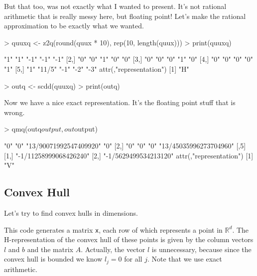 \documentclass{article}
\newcommand{\real}{\mathbb{R}}
\begin{document}
But that too, was not exactly what I wanted to present.
It's not rational arithmetic that is really messy here,
but floating point!  Let's make the rational approximation
to be exactly what we wanted.
\begin{Schunk}
\begin{Sinput}
> quuxq <- z2q(round(quux * 10), rep(10, length(quux)))
> print(quuxq)
\end{Sinput}
\begin{Soutput}
     [,1] [,2]   [,3] [,4] [,5]
[1,] "1"  "1"    "-1" "-1" "-1"
[2,] "0"  "0"    "1"  "0"  "0" 
[3,] "0"  "0"    "0"  "1"  "0" 
[4,] "0"  "0"    "0"  "0"  "1" 
[5,] "1"  "11/5" "-1" "-2" "-3"
attr(,"representation")
[1] "H"
\end{Soutput}
\begin{Sinput}
> outq <- scdd(quuxq)
> print(outq)
\end{Sinput}
\end{Schunk}
Now we have a nice exact representation.  It's the floating
point stuff that is wrong.
\begin{Schunk}
\begin{Sinput}
> qmq(outq$output, out$output)
\end{Sinput}
\begin{Soutput}
     [,1] [,2] [,3]                   [,4]                  
[1,] "0"  "0"  "13/90071992547409920" "0"                   
[2,] "0"  "0"  "0"                    "13/45035996273704960"
     [,5]                  
[1,] "-1/11258999068426240"
[2,] "-1/5629499534213120" 
attr(,"representation")
[1] "V"
\end{Soutput}
\end{Schunk}

\subsection{Convex Hull} \label{sec:conv1}

Let's try to find convex hulls in \verb@d@ dimensions.
\begin{Schunk}
\end{Schunk}
This code generates a matrix \texttt{x}, each row of which represents
a point in $\real^d$.  The H-representation of the convex hull of these
points is given by the column vectors $l$ and $b$ and the matrix $A$.
Actually, the vector $l$ is unnecessary, because since the convex hull
is bounded we know $l_j = 0$ for all $j$.  Note that we use
exact arithmetic.
\end{document}
